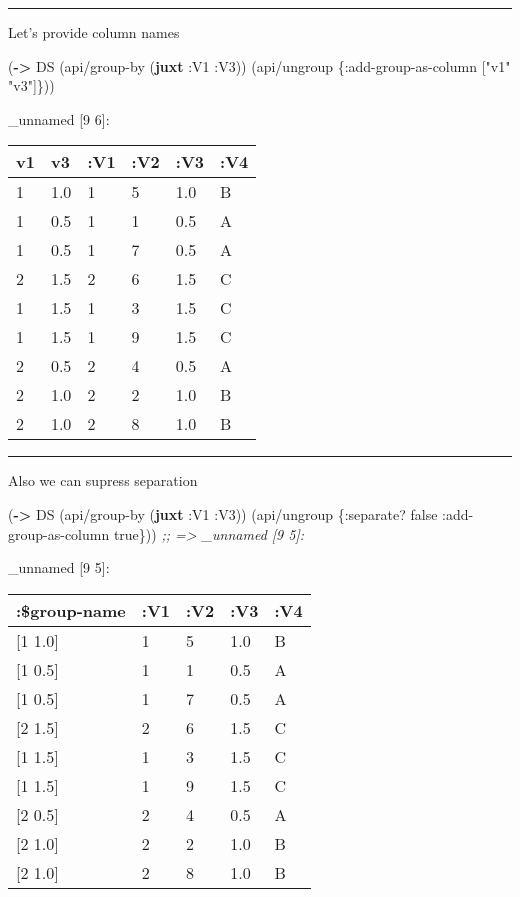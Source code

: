 \documentclass[]{article}
\newenvironment{Shaded}{\begin{snugshade}}{\end{snugshade}}
\newcommand{\AttributeTok}[1]{\textcolor[rgb]{0.77,0.63,0.00}{#1}}
\newcommand{\CommentTok}[1]{\textcolor[rgb]{0.56,0.35,0.01}{\textit{#1}}}
\newcommand{\KeywordTok}[1]{\textcolor[rgb]{0.13,0.29,0.53}{\textbf{#1}}}
\newcommand{\NormalTok}[1]{#1}
\newcommand{\StringTok}[1]{\textcolor[rgb]{0.31,0.60,0.02}{#1}}
\newcommand{\VariableTok}[1]{\textcolor[rgb]{0.00,0.00,0.00}{#1}}
\begin{document}
\begin{center}\rule{0.5\linewidth}{0.5pt}\end{center}

Let's provide column names

\begin{Shaded}
\begin{Highlighting}[]
\NormalTok{(}\KeywordTok{->}\NormalTok{ DS}
\NormalTok{    (api/group-by (}\KeywordTok{juxt} \AttributeTok{:V1} \AttributeTok{:V3}\NormalTok{))}
\NormalTok{    (api/ungroup \{}\AttributeTok{:add-group-as-column}\NormalTok{ [}\StringTok{"v1"} \StringTok{"v3"}\NormalTok{]\}))}
\end{Highlighting}
\end{Shaded}

\_unnamed {[}9 6{]}:

\begin{longtable}[]{@{}llllll@{}}
\toprule
v1 & v3 & :V1 & :V2 & :V3 & :V4\tabularnewline
\midrule
\endhead
1 & 1.0 & 1 & 5 & 1.0 & B\tabularnewline
1 & 0.5 & 1 & 1 & 0.5 & A\tabularnewline
1 & 0.5 & 1 & 7 & 0.5 & A\tabularnewline
2 & 1.5 & 2 & 6 & 1.5 & C\tabularnewline
1 & 1.5 & 1 & 3 & 1.5 & C\tabularnewline
1 & 1.5 & 1 & 9 & 1.5 & C\tabularnewline
2 & 0.5 & 2 & 4 & 0.5 & A\tabularnewline
2 & 1.0 & 2 & 2 & 1.0 & B\tabularnewline
2 & 1.0 & 2 & 8 & 1.0 & B\tabularnewline
\bottomrule
\end{longtable}

\begin{center}\rule{0.5\linewidth}{0.5pt}\end{center}

Also we can supress separation

\begin{Shaded}
\begin{Highlighting}[]
\NormalTok{(}\KeywordTok{->}\NormalTok{ DS}
\NormalTok{    (api/group-by (}\KeywordTok{juxt} \AttributeTok{:V1} \AttributeTok{:V3}\NormalTok{))}
\NormalTok{    (api/ungroup \{}\AttributeTok{:separate}\NormalTok{? }\VariableTok{false}
                  \AttributeTok{:add-group-as-column} \VariableTok{true}\NormalTok{\}))}
\CommentTok{;; => _unnamed [9 5]:}
\end{Highlighting}
\end{Shaded}

\_unnamed {[}9 5{]}:

\begin{longtable}[]{@{}lllll@{}}
\toprule
:\$group-name & :V1 & :V2 & :V3 & :V4\tabularnewline
\midrule
\endhead
{[}1 1.0{]} & 1 & 5 & 1.0 & B\tabularnewline
{[}1 0.5{]} & 1 & 1 & 0.5 & A\tabularnewline
{[}1 0.5{]} & 1 & 7 & 0.5 & A\tabularnewline
{[}2 1.5{]} & 2 & 6 & 1.5 & C\tabularnewline
{[}1 1.5{]} & 1 & 3 & 1.5 & C\tabularnewline
{[}1 1.5{]} & 1 & 9 & 1.5 & C\tabularnewline
{[}2 0.5{]} & 2 & 4 & 0.5 & A\tabularnewline
{[}2 1.0{]} & 2 & 2 & 1.0 & B\tabularnewline
{[}2 1.0{]} & 2 & 8 & 1.0 & B\tabularnewline
\bottomrule
\end{longtable}
\end{document}
